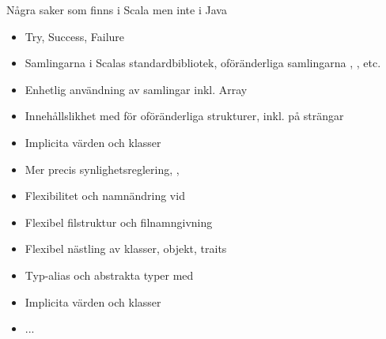 \begin{Slide}{Några saker som finns i Scala men inte i Java}
\begin{multicols}{2}
\begin{itemize}
\item Try, Success, Failure

\item Samlingarna i Scalas standardbibliotek, oföränderliga samlingarna , , etc.

\item Enhetlig användning av samlingar inkl. Array

\item Innehållslikhet med \code{==} för oföränderliga strukturer, inkl. \code{< <= > >= } på strängar

\item Implicita värden och klasser

\item Mer precis synlighetsreglering, , 

\item Flexibilitet och namnändring vid  

\item Flexibel filstruktur och filnamngivning

\item Flexibel nästling av klasser, objekt, traits

\item Typ-alias och abstrakta typer med 

\item Implicita värden och klasser

\item ...
\end{itemize}
\end{multicols}
\end{Slide}


